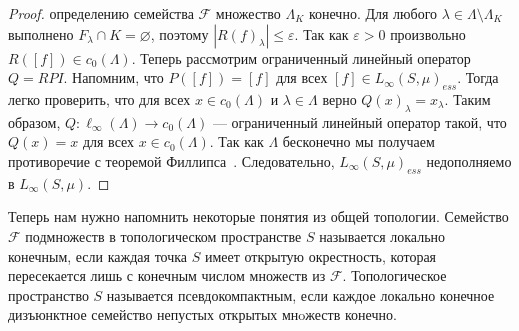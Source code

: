 \documentclass[12pt]{article}
\begin{document}
\begin{proof}
    определению семейства $\mathcal{F}$ множество $\Lambda_K$ конечно. Для
    любого $\lambda\in\Lambda\setminus \Lambda_K$ выполнено $F_\lambda\cap
        K=\varnothing$, поэтому $|{R(f)}_\lambda|\leq\varepsilon$. Так как
    $\varepsilon>0$ произвольно $R([f])\in c_0(\Lambda)$. Теперь рассмотрим
    ограниченный линейный оператор $Q=RPI$. Напомним, что $P([f])=[f]$ для всех
    $[f]\in {L_\infty(S,\mu)}_{ess}$. Тогда легко проверить, что для всех $x\in
        c_0(\Lambda)$ и $\lambda\in\Lambda$ верно ${Q(x)}_\lambda=x_\lambda$. Таким
    образом, $Q:\ell_\infty(\Lambda)\to c_0(\Lambda)$ --- ограниченный линейный
    оператор такой, что $Q(x)=x$ для всех $x\in c_0(\Lambda)$. Так как $\Lambda$
    бесконечно мы получаем противоречие с теоремой
    Филлипса~\cite{PhilOnLinTran}. Следовательно, ${L_\infty(S,\mu)}_{ess}$
    недополняемо в $L_\infty(S,\mu)$.
\end{proof}

Теперь нам нужно напомнить некоторые понятия из общей топологии. Семейство
$\mathcal{F}$ подмножеств в топологическом пространстве $S$ называется локально
конечным, если каждая точка $S$ имеет открытую окрестность, которая пересекается
лишь с конечным числом множеств из $\mathcal{F}$. Топологическое пространство
$S$ называется псевдокомпактным, если каждое локально конечное дизъюнктное
семейство непустых открытых мнoжеств конечно.
\end{document}
